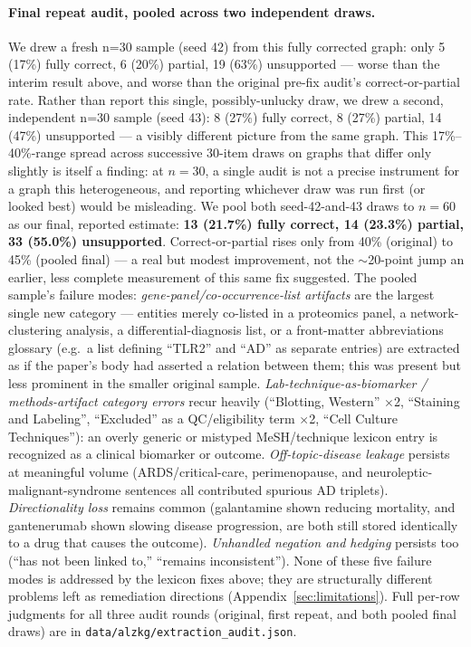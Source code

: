 \documentclass{article}
\begin{document}
\paragraph{Final repeat audit, pooled across two independent draws.} We drew a fresh n=30 sample (seed 42) from this fully corrected graph: only 5 (17\%) fully correct, 6 (20\%) partial, 19 (63\%) unsupported --- worse than the interim result above, and worse than the original pre-fix audit's correct-or-partial rate. Rather than report this single, possibly-unlucky draw, we drew a second, independent n=30 sample (seed 43): 8 (27\%) fully correct, 8 (27\%) partial, 14 (47\%) unsupported --- a visibly different picture from the same graph. This 17\%--40\%-range spread across successive 30-item draws on graphs that differ only slightly is itself a finding: at $n{=}30$, a single audit is not a precise instrument for a graph this heterogeneous, and reporting whichever draw was run first (or looked best) would be misleading. We pool both seed-42-and-43 draws to $n{=}60$ as our final, reported estimate: \textbf{13 (21.7\%) fully correct, 14 (23.3\%) partial, 33 (55.0\%) unsupported}. Correct-or-partial rises only from 40\% (original) to 45\% (pooled final) --- a real but modest improvement, not the $\sim$20-point jump an earlier, less complete measurement of this same fix suggested. The pooled sample's failure modes: \emph{gene-panel/co-occurrence-list artifacts} are the largest single new category --- entities merely co-listed in a proteomics panel, a network-clustering analysis, a differential-diagnosis list, or a front-matter abbreviations glossary (e.g.\ a list defining ``TLR2'' and ``AD'' as separate entries) are extracted as if the paper's body had asserted a relation between them; this was present but less prominent in the smaller original sample. \emph{Lab-technique-as-biomarker / methods-artifact category errors} recur heavily (``Blotting, Western'' $\times$2, ``Staining and Labeling'', ``Excluded'' as a QC/eligibility term $\times$2, ``Cell Culture Techniques''): an overly generic or mistyped MeSH/technique lexicon entry is recognized as a clinical biomarker or outcome. \emph{Off-topic-disease leakage} persists at meaningful volume (ARDS/critical-care, perimenopause, and neuroleptic-malignant-syndrome sentences all contributed spurious AD triplets). \emph{Directionality loss} remains common (galantamine shown reducing mortality, and gantenerumab shown slowing disease progression, are both still stored identically to a drug that causes the outcome). \emph{Unhandled negation and hedging} persists too (``has not been linked to,'' ``remains inconsistent''). None of these five failure modes is addressed by the lexicon fixes above; they are structurally different problems left as remediation directions (Appendix~\ref{sec:limitations}). Full per-row judgments for all three audit rounds (original, first repeat, and both pooled final draws) are in \texttt{data/alzkg/extraction\_audit.json}.
\end{document}
